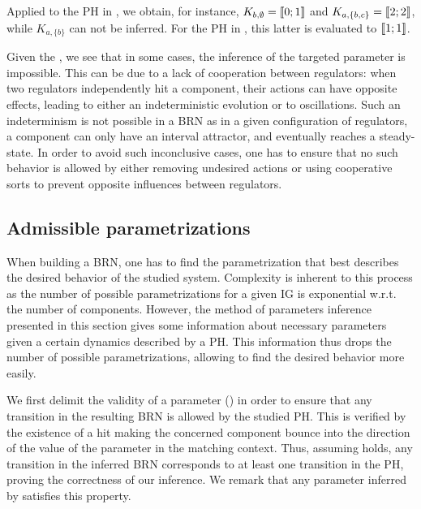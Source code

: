 \begin{example*}
Applied to the PH in , we obtain, for instance, 
$K_{b,\emptyset} = \llbracket 0 ; 1 \rrbracket$ and
$K_{a,\{b,c\}} = \llbracket 2 ; 2 \rrbracket$,
while $K_{a,\{b\}}$ can not be inferred.
For the PH in , this latter is evaluated to $\llbracket 1 ; 1 \rrbracket$.
\end{example*}

Given the , we see that in some cases, the inference of the targeted parameter is impossible.
This can be due to a lack of cooperation between regulators: when two regulators independently hit a component, their actions can have opposite effects, leading to either an indeterministic evolution or to oscillations.
Such an indeterminism is not possible in a BRN as in a given configuration of regulators, a component can only have an interval attractor, and eventually reaches a steady-state.
In order to avoid such inconclusive cases, one has to ensure that no such behavior is allowed by
either removing undesired actions or using cooperative sorts to prevent opposite influences between
regulators.

\subsection{Admissible parametrizations}\label{ssec:admissible-K}

When building a BRN, one has to find the parametrization that best describes the desired behavior of the studied system.
Complexity is inherent to this process as the number of possible parametrizations for a given IG is exponential w.r.t. the number of components.
However, the method of parameters inference presented in this section gives some information about necessary parameters given a certain dynamics described by a PH.
This information thus drops the number of possible parametrizations, allowing to find the desired behavior more easily.

We first delimit the validity of a parameter () in order to ensure that any
transition in the resulting BRN is allowed by the studied PH.
This is verified by the existence of a hit making the concerned component bounce into the direction
of the value of the parameter in the matching context.
Thus, assuming  holds, any transition in the inferred BRN corresponds to at least
one transition in the PH, proving the correctness of our inference.
We remark that any parameter inferred by  satisfies this property.

